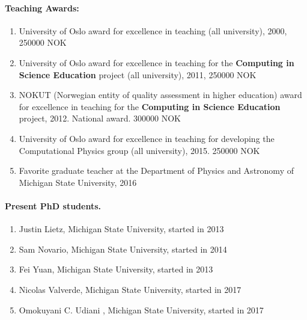 \documentclass[a4wide,10pt]{article}
\begin{document}
\paragraph{Teaching Awards:}
\begin{enumerate}
\item University of Oslo award for excellence in teaching (all university), 2000, 250000 NOK

\item University of Oslo award for excellence in teaching for the \textbf{Computing in Science Education} project (all university), 2011, 250000 NOK

\item NOKUT (Norwegian entity of quality assessment in higher education) award for excellence in teaching for the \textbf{Computing in Science Education} project, 2012. National award. 300000 NOK

\item University of Oslo award for excellence in teaching for developing the Computational Physics group (all university), 2015. 250000 NOK

\item Favorite graduate teacher at the Department of Physics and Astronomy of Michigan State University, 2016 
\end{enumerate}

\paragraph{Present PhD students.}
\begin{enumerate}
\item Justin Lietz, Michigan State University, started in 2013

\item Sam Novario, Michigan State University, started in 2014

\item Fei Yuan, Michigan State University, started in 2013

\item Nicolas Valverde, Michigan State University, started in 2017

\item Omokuyani C. Udiani , Michigan State University, started in 2017
\end{enumerate}

\end{document}
